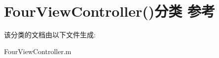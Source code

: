 \hypertarget{category_four_view_controller_07_08}{\section{Four\-View\-Controller()分类 参考}
\label{category_four_view_controller_07_08}
}


该分类的文档由以下文件生成\-:\begin{DoxyCompactItemize}
\item 
Four\-View\-Controller.\-m\end{DoxyCompactItemize}
